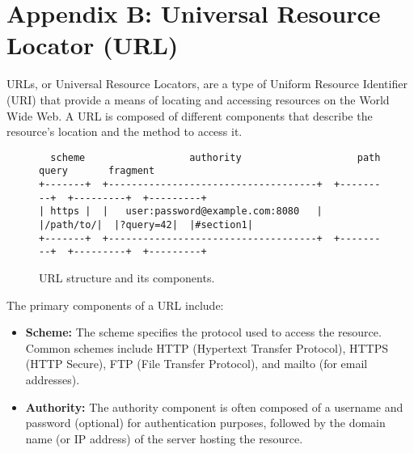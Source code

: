 \renewcommand{\thefigure}{B\arabic{figure}}
\renewcommand{\thetable}{B\arabic{table}}
\setcounter{figure}{0}
\setcounter{table}{0}

\clearpage
\section{Appendix B: Universal Resource Locator (URL)}
\label{appendixB}
{
URLs, or Universal Resource Locators, are a type of Uniform Resource Identifier (URI) that provide a means of locating and accessing resources on the World Wide Web. A URL is composed of different components that describe the resource's location and the method to access it.

\begin{figure}[h!]
    \newsavebox\myv
    \begin{lrbox}{\myv}\begin{minipage}{\linewidth}\centering
        \begin{verbatim}
  scheme                  authority                    path        query       fragment
+-------+  +------------------------------------+  +---------+  +---------+  +---------+
| https |  |   user:password@example.com:8080   |  |/path/to/|  |?query=42|  |#section1|
+-------+  +------------------------------------+  +---------+  +---------+  +---------+
        \end{verbatim}
    \end{minipage}\end{lrbox}

    \resizebox{0.825\textwidth}{!}{\usebox\myv}
    \caption{URL structure and its components.}
    \label{fig:url_structure}
\end{figure}

\noindent The primary components of a URL include:
\begin{itemize}
    \item \textbf{Scheme:} The scheme specifies the protocol used to access the resource. Common schemes include HTTP (Hypertext Transfer Protocol), HTTPS (HTTP Secure), FTP (File Transfer Protocol), and mailto (for email addresses).
    
    \item \textbf{Authority:} The authority component is often composed of a username and password (optional) for authentication purposes, followed by the domain name (or IP address) of the server hosting the resource.
    

\end{itemize}}
